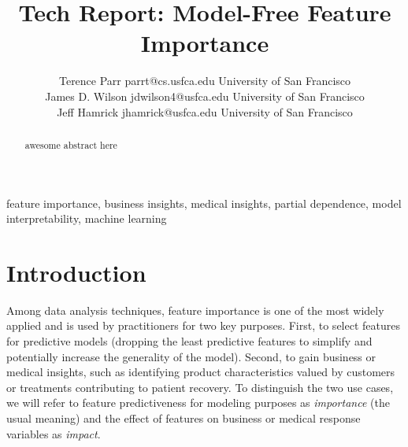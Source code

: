\documentclass[11pt]{article}
\begin{document}
\def\spacingset#1{\renewcommand{\baselinestretch}%
{#1}\small\normalsize} \spacingset{1}



\title{\bf Tech Report: Model-Free Feature Importance}

\author{Terence Parr \email parrt@cs.usfca.edu
\addr University of San Francisco\\
\AND James D. Wilson \email jdwilson4@usfca.edu
\addr University of San Francisco\\
\AND Jeff Hamrick \email jhamrick@usfca.edu
      \addr University of San Francisco}

\maketitle

\begin{abstract}%
awesome abstract here
\end{abstract}

\begin{keywords}
feature importance, business insights, medical insights, partial dependence, model interpretability, machine learning
\end{keywords}

\section{Introduction}
\label{sec:intro}

Among data analysis techniques, feature importance is one of the most widely applied and is used by practitioners for two key purposes. First, to select features for predictive models (dropping the least predictive features to simplify and potentially increase the generality of the model). Second, to gain business or medical insights, such as identifying product characteristics valued by customers or treatments contributing to patient recovery.  To distinguish the two use cases, we will refer to feature predictiveness for modeling purposes as {\em importance} (the usual meaning) and the effect of features on business or medical response variables as {\em impact}.
\end{document}
